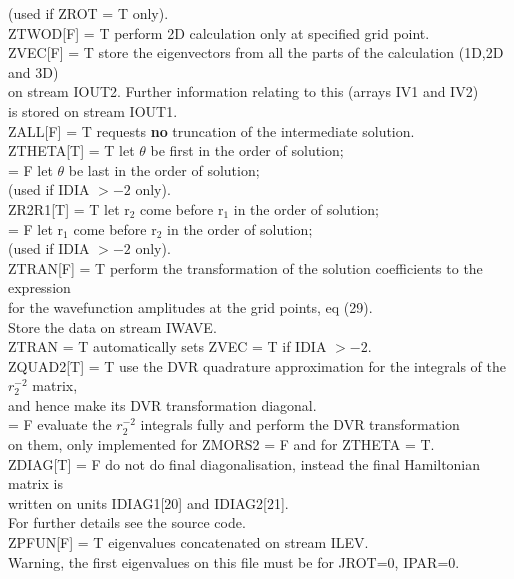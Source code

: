 \documentclass{elsart}
\begin{document}
\begin{tabbing}
         \> (used if ZROT = T only).\\
ZTWOD[F] \> = T perform 2D calculation only at specified grid point.\\
ZVEC[F]  \> = T store the eigenvectors from all the parts of the calculation
(1D,2D and 3D) \\
\> on stream IOUT2. Further information relating to this (arrays IV1 and
IV2)\\
\> is stored on stream IOUT1. \\
ZALL[F] \> = T requests {\bf no} truncation of the intermediate solution. \\
ZTHETA[T]\> = T let $\theta $ be first in the order of solution;\\
         \> = F let $\theta $ be last in the order of solution; \\
         \> (used if IDIA $> -2$ only).\\
ZR2R1[T]\> = T let r$_2$ come before r$_1$ in the order of solution;\\
         \> = F let r$_1$ come before r$_2$ in the order of solution;\\
         \> (used if IDIA $> -2$ only).\\
ZTRAN[F] \> = T perform the transformation of the solution coefficients
to the expression\\
\> for the wavefunction amplitudes at the grid points, eq (29).\\
\> Store the data on stream IWAVE.\\
\>  ZTRAN = T automatically sets ZVEC = T if IDIA $> -2$. \\
ZQUAD2[T] \> = T use the DVR quadrature approximation for the integrals of
the $r_2^{-2}$ matrix,\\
          \> and hence make its DVR transformation diagonal. \\
          \> = F evaluate the $r_2^{-2}$ integrals fully and perform the
DVR  transformation \\
\> on them, only implemented for ZMORS2 = F and for ZTHETA = T.\\
ZDIAG[T] \> = F do not do final diagonalisation, instead the final Hamiltonian
matrix is\\
\> written on units IDIAG1[20] and IDIAG2[21]. \\
\> For further details see the
source code.\\
ZPFUN[F]\> = T eigenvalues concatenated on stream ILEV.\\
 \> Warning, the first eigenvalues on this file must be for JROT=0, IPAR=0.\\

\end{tabbing}
\end{document}
